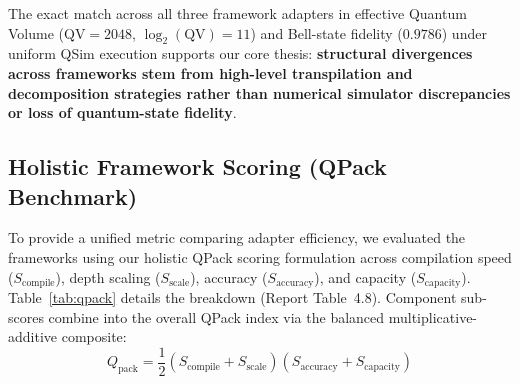 \documentclass[runningheads]{llncs}
\begin{document}
\begin{table}[htbp]
\centering
\caption{Quantum Volume analysis across framework adapters executed via the QSim statevector kernel (Report Table~4.7). Identical QV and Bell-state fidelity across adapters indicate a consistent underlying execution substrate.}
\label{tab:qv}
\renewcommand{\arraystretch}{1.15}
\setlength{\tabcolsep}{12pt}
\end{table}

The exact match across all three framework adapters in effective Quantum Volume ($\text{QV} = 2048$, $\log_2(\text{QV}) = 11$) and Bell-state fidelity ($0.9786$) under uniform QSim execution supports our core thesis: \textbf{structural divergences across frameworks stem from high-level transpilation and decomposition strategies rather than numerical simulator discrepancies or loss of quantum-state fidelity}.

\subsection{Holistic Framework Scoring (QPack Benchmark)}

To provide a unified metric comparing adapter efficiency, we evaluated the frameworks using our holistic QPack scoring formulation across compilation speed ($S_{\text{compile}}$), depth scaling ($S_{\text{scale}}$), accuracy ($S_{\text{accuracy}}$), and capacity ($S_{\text{capacity}}$). Table~\ref{tab:qpack} details the breakdown (Report Table~4.8). Component sub-scores combine into the overall QPack index via the balanced multiplicative-additive composite:
\begin{equation}
Q_{\text{pack}} = \frac{1}{2}\left(S_{\text{compile}} + S_{\text{scale}}\right)\left(S_{\text{accuracy}} + S_{\text{capacity}}\right)
\end{equation}
\end{document}
